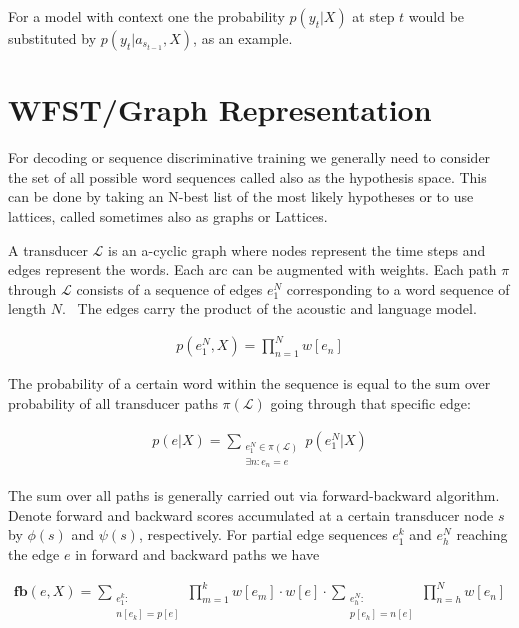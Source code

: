 \documentclass[a4paper,13.5pt]{extarticle}
\begin{document}
For a model with context one the probability $p(y_t|X)$ at step $t$ would be substituted by $p(y_t|a_{s_{t-1}}, X)$, as an example.

	
	
	
	
	
	
	
	\section{WFST/Graph Representation}
	
	For decoding or sequence discriminative training we generally need to consider the set of all possible word sequences called also as the hypothesis space. This can be done by taking an N-best list of the most likely hypotheses or to use lattices, called sometimes also as graphs or Lattices.
	
	A transducer $\mathcal{L}$ is an a-cyclic graph where nodes represent the time steps and edges represent the words. Each arc can be augmented with weights. Each path $\pi$ through $\mathcal{L}$  consists of a sequence of edges $e_1^N$ corresponding to a word sequence of length $N$. \ The edges carry the product of the acoustic and language model.
	
	\begin{align}
		\label{probpath}
		p(e_1^N, X) = \prod_{n=1}^N w[e_n]
	\end{align}
	
	The probability of a certain word within the sequence is equal to the sum over probability of all transducer paths $\pi(\mathcal{L})$ going through that specific edge:
	
	\begin{align}
		\label{probedge}
		p(e | X) = \sum_{\substack{e_1^N \in \pi(\mathcal{L})\\ \exists n: e_n=e}}p(e_1^N | X)
	\end{align}
	
	The sum over all paths is generally carried out via forward-backward algorithm. Denote forward and backward scores accumulated at a certain transducer node $s$ by $\phi(s)$ and $\psi(s)$, respectively. For partial edge sequences $e_1^k$ and  $e_h^N$ reaching the edge $e$ in forward and backward paths we have
	
	\begin{align}
		\label{fwdbkwd}
		\mathbf{fb}(e, X)  = \sum_{\substack{e_1^k: \\ n[e_k] = p[e]}}\prod_{m=1}^k w[e_m] \cdot w[e] \cdot  \sum_{\substack{e_h^N: \\ p[e_h] = n[e]}}\prod_{n=h}^N w[e_n] 
	\end{align}
	
\end{document}
